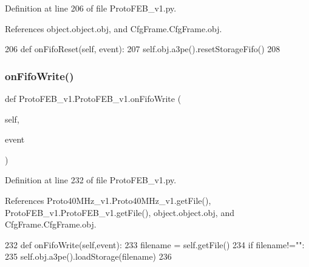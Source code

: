 Definition at line 206 of file Proto\+F\+E\+B\+\_\+v1.\+py.



References object.\+object.\+obj, and Cfg\+Frame.\+Cfg\+Frame.\+obj.


\begin{DoxyCode}
206     \textcolor{keyword}{def }onFifoReset(self, event):
207         self.obj.a3pe().resetStorageFifo()
208 
\end{DoxyCode}
\mbox{\label{classProtoFEB__v1_1_1ProtoFEB__v1_a1ba3f8146393f309ab8c3b88fb9c1c6e}} 
\subsubsection{\texorpdfstring{on\+Fifo\+Write()}{onFifoWrite()}}
{\footnotesize\ttfamily def Proto\+F\+E\+B\+\_\+v1.\+Proto\+F\+E\+B\+\_\+v1.\+on\+Fifo\+Write (\begin{DoxyParamCaption}\item[{}]{self,  }\item[{}]{event }\end{DoxyParamCaption})}



Definition at line 232 of file Proto\+F\+E\+B\+\_\+v1.\+py.



References Proto40\+M\+Hz\+\_\+v1.\+Proto40\+M\+Hz\+\_\+v1.\+get\+File(), Proto\+F\+E\+B\+\_\+v1.\+Proto\+F\+E\+B\+\_\+v1.\+get\+File(), object.\+object.\+obj, and Cfg\+Frame.\+Cfg\+Frame.\+obj.


\begin{DoxyCode}
232     \textcolor{keyword}{def }onFifoWrite(self,event):
233         filename = self.getFile()
234         \textcolor{keywordflow}{if} filename!=\textcolor{stringliteral}{""}:
235             self.obj.a3pe().loadStorage(filename)
236 
\end{DoxyCode}
\mbox{\label{classProtoFEB__v1_1_1ProtoFEB__v1_a737330f2c73fda78aed98f9ce652ec45}} 
